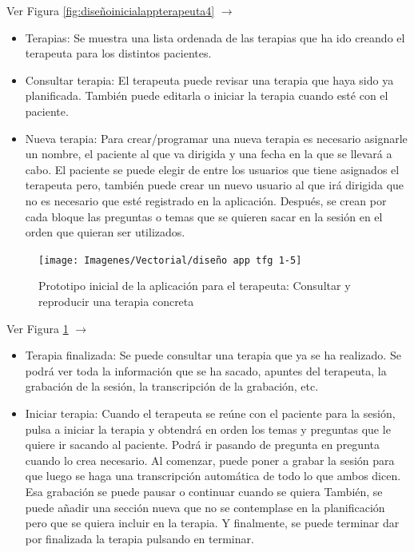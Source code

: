 Ver Figura \ref{fig:diseñoinicialappterapeuta4} $\rightarrow$
\begin{itemize}
	\item Terapias: Se muestra una lista ordenada de las terapias que ha ido creando el terapeuta para los distintos pacientes.
	\item Consultar terapia: El terapeuta puede revisar una terapia que haya sido ya planificada. También puede editarla o iniciar la terapia cuando esté con el paciente. 
	\item Nueva terapia: Para crear/programar una nueva terapia es necesario asignarle un nombre, el paciente al que va dirigida y una fecha en la que se llevará a cabo. El paciente se puede elegir de entre los usuarios que tiene asignados el terapeuta pero, también puede crear un nuevo usuario al que irá dirigida que no es necesario que esté registrado en la aplicación. Después, se crean por cada bloque las preguntas o temas que se quieren sacar en la sesión en el orden que quieran ser utilizados.
\end{itemize}

\begin{figure}[h]
	\centering
	\texttt{[image: Imagenes/Vectorial/diseño app tfg 1-5]}
	\caption{Prototipo inicial de la aplicación para el terapeuta: Consultar y reproducir una terapia concreta}
	\label{fig:diseñoinicialappterapeuta5}
\end{figure}

Ver Figura \ref{fig:diseñoinicialappterapeuta5} $\rightarrow$
\begin{itemize}
	\item Terapia finalizada: Se puede consultar una terapia que ya se ha realizado. Se podrá ver toda la información que se ha sacado, apuntes del terapeuta, la grabación de la sesión, la transcripción de la grabación, etc.
	\item Iniciar terapia: Cuando el terapeuta se reúne con el paciente para la sesión, pulsa a iniciar la terapia y obtendrá en orden los temas y preguntas que le quiere ir sacando al paciente. Podrá ir pasando de pregunta en pregunta cuando lo crea necesario. Al comenzar, puede poner a grabar la sesión para que luego se haga una transcripción automática de todo lo que ambos dicen. Esa grabación se puede pausar o continuar cuando se quiera También, se puede añadir una sección nueva que no se contemplase en la planificación pero que se quiera incluir en la terapia. Y finalmente, se puede terminar dar por finalizada la terapia pulsando en terminar. 
\end{itemize}

